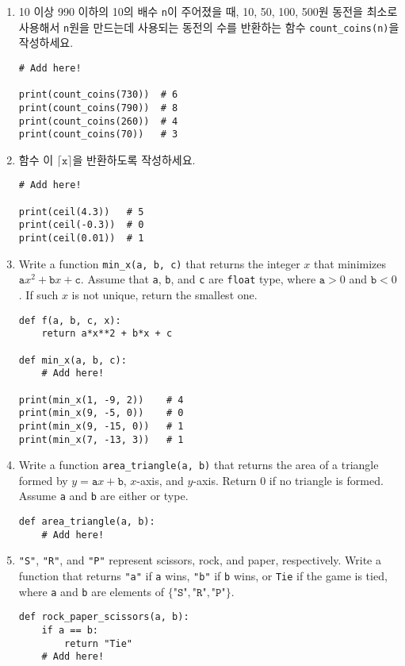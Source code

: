 \documentclass[../main.tex]{subfiles}
\begin{document}
\begin{enumerate}
\item 10 이상 990 이하의 10의 배수 \verb|n|이 주어졌을 때, 10, 50, 100, 500원
  동전을 최소로 사용해서 \verb|n|원을 만드는데 사용되는 동전의 수를 반환하는
  함수 \verb|count_coins(n)|을 작성하세요.
\begin{verbatim}
# Add here!

print(count_coins(730))  # 6
print(count_coins(790))  # 8
print(count_coins(260))  # 4
print(count_coins(70))   # 3
\end{verbatim}

\item  함수 이 $\lceil\texttt{x}\rceil$을
  반환하도록 작성하세요.
\begin{verbatim}
# Add here!

print(ceil(4.3))   # 5
print(ceil(-0.3))  # 0
print(ceil(0.01))  # 1
\end{verbatim}

\item  Write a function \verb/min_x(a, b, c)/ that returns the integer $x$ that minimizes $\texttt{a}x^2 + \texttt{b}x + \texttt{c}$.
Assume that \texttt{a}, \texttt{b}, and \texttt{c} are \texttt{float} type, where $\texttt{a} > 0$ and $\texttt{b} < 0$.
If such $x$ is not unique, return the smallest one.
\begin{verbatim}
def f(a, b, c, x):
    return a*x**2 + b*x + c

def min_x(a, b, c):
    # Add here!

print(min_x(1, -9, 2))    # 4
print(min_x(9, -5, 0))    # 0
print(min_x(9, -15, 0))   # 1
print(min_x(7, -13, 3))   # 1
\end{verbatim}

\item  Write a function \verb/area_triangle(a, b)/ that returns the area of a
  triangle formed by $y = \texttt{a}x + \texttt{b}$, $x$-axis, and $y$-axis.
  Return 0 if no triangle is formed. Assume \texttt{a} and \texttt{b} are
  either  or  type.

\begin{verbatim}
def area_triangle(a, b):
    # Add here!

\end{verbatim}

\item \texttt{"S"}, \texttt{"R"}, and \texttt{"P"} represent scissors, rock,
  and paper, respectively.  Write a function  that returns \texttt{"a"} if \texttt{a} wins, \texttt{"b"} if \texttt{b}
  wins, or \texttt{Tie} if the game is tied, where \texttt{a} and \texttt{b}
  are elements of $\{\texttt{"S"}, \texttt{"R"}, \texttt{"P"}\}$.
\begin{verbatim}
def rock_paper_scissors(a, b):
    if a == b:
        return "Tie"
    # Add here!


\end{verbatim}
\end{enumerate}
\end{document}
